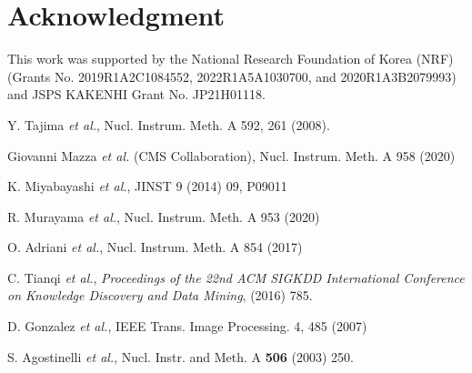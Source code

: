 \documentclass[preprint,12pt,times,a4paper]{elsarticle}
\begin{document}
\label{sec:con}



\section*{Acknowledgment}
This work was supported by the National Research Foundation of Korea (NRF) 
(Grants No. 2019R1A2C1084552, 2022R1A5A1030700, and 2020R1A3B2079993) and JSPS KAKENHI Grant No. JP21H01118.

\begin{thebibliography}{99}
 
Y. Tajima {\it et al.}, Nucl. Instrum. Meth. A 592, 261 (2008).

Giovanni Mazza {\it et al.} (CMS Collaboration), Nucl. Instrum. Meth. A 958 (2020)

K. Miyabayashi {\it et al.}, JINST 9 (2014) 09, P09011

R. Murayama {\it et al.}, Nucl. Instrum. Meth. A 953 (2020) 
 
O. Adriani {\it et al.}, Nucl. Instrum. Meth. A 854 (2017) 

C. Tianqi {\it et al.}, 
{\it Proceedings of the 22nd ACM SIGKDD International Conference on Knowledge Discovery and Data Mining},
(2016) 785.

D. Gonzalez {\it et al.}, IEEE Trans. Image Processing. 4, 485 (2007)

S. Agostinelli {\it et al.},  Nucl. Instr. and Meth. A {\bf 506} (2003) 250.

\end{thebibliography}


%
%

\end{document}
